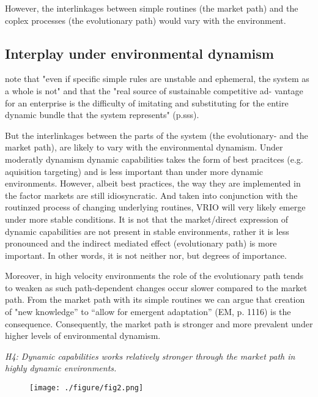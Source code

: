 \documentclass[review,fleqn]{elsarticle}\usepackage[]{graphicx}\usepackage[]{color}
\begin{document}
However, the interlinkages between simple routines (the market path) and the coplex
processes (the evolutionary path) would vary with the environment. 

\subsection{Interplay under environmental dynamism}

\cite{DiStefano2014} note that "even if specific simple rules are unstable and ephemeral,
the system as a whole is not" and that the "real source of sustainable competitive ad- vantage for an enterprise is the difficulty of imitating and substituting for the entire dynamic bundle that the system represents" (p.sss).

But the interlinkages between the parts of the system (the evolutionary- and the market
path), are likely to vary with the environmental dynamism. Under moderatly dynamism
dynamic capabilities takes the form of best pracitces (e.g. aquisition targeting) and is
less important than under more dynamic environments. However, albeit best practices, the
way they are implemented in the factor markets are still idiosyncratic. And taken into
conjunction with the routinzed process of changing underlying routines, VRIO will very
likely emerge under more stable conditions. It is not that the market/direct expression
of dynamic capabilities are not present in stable environments, rather it is less pronounced and the indirect
mediated effect (evolutionary path) is more important. In other words, it is not neither
nor, but degrees of importance. 

Moreover, in high velocity environments the role of the evolutionary path tends to
weaken as such path-dependent changes occur slower compared to the market path. From the
market path with its simple routines we can argue that creation of "new knowledge” to
“allow for emergent adaptation” (EM, p. 1116) is the consequence. Consequently, the market
path is stronger and more prevalent under higher levels of environmental dynamism.

\emph{H4: Dynamic capabilities works relatively stronger through the market path in highly
dynamic environments.} 


\begin{figure}
  \centering
  \captionsetup{width=0.5\linewidth}
  \texttt{[image: ./figure/fig2.png]}
  \label{fig:fig2}
\end{figure}
\end{document}
